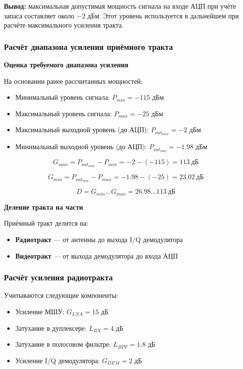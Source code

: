 \documentclass[a4paper,12pt]{article}
\begin{document}
\textbf{Вывод:} максимальная допустимая мощность сигнала на входе АЦП при учёте запаса составляет около $-2$ дБм. Этот уровень используется в дальнейшем при расчёте максимального усиления тракта.


\subsubsection{Расчёт диапазона усиления приёмного тракта}

\textbf{Оценка требуемого диапазона усиления}

На основании ранее рассчитанных мощностей:

\begin{itemize}
\item Минимальный уровень сигнала: $P_{min} = -115$ дБм
\item Максимальный уровень сигнала: $P_{max} = -25$ дБм
\item Максимальный выходной уровень (до АЦП): $P_{out_{max}} = -2$ дБм
\item Минимальный выходной уровень (до АЦП): $P_{out_{min}} = -1.98$ дБм
\end{itemize}

\begin{equation}
G_{max} = P_{out_{max}} - P_{min} = -2 - (-115) = 113\ \text{дБ}
\end{equation}

\begin{equation}
G_{min} = P_{out_{min}} - P_{max} = -1.98 - (-25) = 23.02\ \text{дБ}
\end{equation}

\begin{equation}
D = G_{min} \ldots G_{max} = 26.98 \ldots 113\ \text{дБ}
\end{equation}

\textbf{Деление тракта на части}

Приёмный тракт делится на:
\begin{itemize}
\item \textbf{Радиотракт} — от антенны до выхода I/Q демодулятора
\item \textbf{Видеотракт} — от выхода демодулятора до входа АЦП
\end{itemize}

\subsubsection{Расчёт усиления радиотракта}

Учитываются следующие компоненты:
\begin{itemize}
\item Усиление МШУ: $G_{LNA} = 15$ дБ
\item Затухание в дуплексере: $L_{RX} = 4$ дБ
\item Затухание в полосовом фильтре: $L_{BPF} = 1.8$ дБ
\item Усиление I/Q демодулятора: $G_{DEM} = 2$ дБ
\end{itemize}
\end{document}
